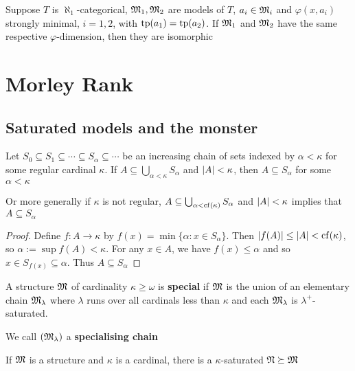 \documentclass[11pt]{article}
\begin{document}
\begin{corollary}[]
Suppose \(T\) is \(\aleph_1\)-categorical, \(\mathfrak{M}_1,\mathfrak{M}_2\) are models of \(T\), \(a_i\in\mathfrak{M}_i\) and \(\varphi(x,a_i)\)
strongly minimal, \(i=1,2\), with \(\operatorname{tp}(a_1)=\operatorname{tp}(a_2)\). If \(\mathfrak{M}_1\) and \(\mathfrak{M}_2\) have the same
respective \(\varphi\)-dimension, then they are isomorphic
\end{corollary}
\section{Morley Rank}
\label{sec:org5f38564}
\subsection{Saturated models and the monster}
\label{sec:org320c7c1}
\begin{lemma}[]
\label{11-1}
Let \(S_0\subseteq S_1\subseteq\cdots\subseteq S_\alpha\subseteq\cdots\) be an increasing chain of sets indexed by \(\alpha<\kappa\) for some regular
cardinal \(\kappa\). If \(A\subseteq\bigcup_{\alpha<\kappa}S_\alpha\) and \(\abs{A}<\kappa\), then \(A\subseteq S_\alpha\) for some \(\alpha<\kappa\)

Or more generally if \(\kappa\) is not regular, \(A\subseteq\bigcup_{\alpha<\operatorname{cf}(\kappa)}S_\alpha\) and \(\abs{A}<\kappa\) implies
that \(A\subseteq S_\alpha\)
\end{lemma}

\begin{proof}
Define \(f:A\to\kappa\) by \(f(x)=\min\{\alpha:x\in S_\alpha\}\). Then \(\abs{f(A)}\le\abs{A}<\cf(\kappa)\),
so \(\alpha:=\sup f(A)<\kappa\). For any \(x\in A\), we have \(f(x)\le\alpha\) and so \(x\in S_{f(x)}\subseteq\alpha\).
Thus \(A\subseteq S_\alpha\)
\end{proof}

\begin{definition}[]
A structure \(\mathfrak{M}\) of cardinality \(\kappa\ge\omega\) is \textbf{special} if \(\mathfrak{M}\) is the union of an elementary
chain \(\mathfrak{M}_\lambda\) where \(\lambda\) runs over all cardinals less than \(\kappa\) and each \(\mathfrak{M}_\lambda\) is \(\lambda^+\)-saturated.
\end{definition}


We call \((\mathfrak{M}_\lambda)\) a \textbf{specialising chain}

\begin{theorem}[]
If \(\mathfrak{M}\) is a structure and \(\kappa\) is a cardinal, there is a \(\kappa\)-saturated \(\mathfrak{N}\succeq\mathfrak{M}\)
\end{theorem}
\end{document}
